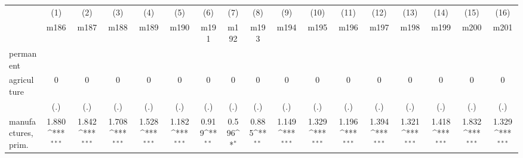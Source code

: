{
\def\sym#1{\ifmmode^{#1}\else\(^{#1}\)\fi}
\begin{tabular}{l*{16}{c}}
\hline\hline
                    &\multicolumn{1}{c}{(1)}&\multicolumn{1}{c}{(2)}&\multicolumn{1}{c}{(3)}&\multicolumn{1}{c}{(4)}&\multicolumn{1}{c}{(5)}&\multicolumn{1}{c}{(6)}&\multicolumn{1}{c}{(7)}&\multicolumn{1}{c}{(8)}&\multicolumn{1}{c}{(9)}&\multicolumn{1}{c}{(10)}&\multicolumn{1}{c}{(11)}&\multicolumn{1}{c}{(12)}&\multicolumn{1}{c}{(13)}&\multicolumn{1}{c}{(14)}&\multicolumn{1}{c}{(15)}&\multicolumn{1}{c}{(16)}\\
                    &\multicolumn{1}{c}{m186}&\multicolumn{1}{c}{m187}&\multicolumn{1}{c}{m188}&\multicolumn{1}{c}{m189}&\multicolumn{1}{c}{m190}&\multicolumn{1}{c}{m191}&\multicolumn{1}{c}{m192}&\multicolumn{1}{c}{m193}&\multicolumn{1}{c}{m194}&\multicolumn{1}{c}{m195}&\multicolumn{1}{c}{m196}&\multicolumn{1}{c}{m197}&\multicolumn{1}{c}{m198}&\multicolumn{1}{c}{m199}&\multicolumn{1}{c}{m200}&\multicolumn{1}{c}{m201}\\
\hline
permanent           &                     &                     &                     &                     &                     &                     &                     &                     &                     &                     &                     &                     &                     &                     &                     &                     \\
agriculture         &           0         &           0         &           0         &           0         &           0         &           0         &           0         &           0         &           0         &           0         &           0         &           0         &           0         &           0         &           0         &           0         \\
                    &         (.)         &         (.)         &         (.)         &         (.)         &         (.)         &         (.)         &         (.)         &         (.)         &         (.)         &         (.)         &         (.)         &         (.)         &         (.)         &         (.)         &         (.)         &         (.)         \\
[1em]
manufactures, prim. &       1.880\sym{***}&       1.842\sym{***}&       1.708\sym{***}&       1.528\sym{***}&       1.182\sym{***}&       0.919\sym{**} &       0.596\sym{*}  &       0.885\sym{**} &       1.149\sym{***}&       1.329\sym{***}&       1.196\sym{***}&       1.394\sym{***}&       1.321\sym{***}&       1.418\sym{***}&       1.832\sym{***}&       1.329\sym{***}\\

\end{tabular}}
